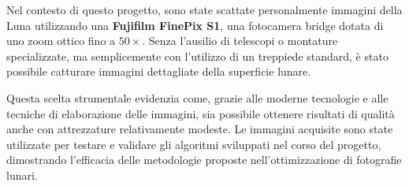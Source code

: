 Nel contesto di questo progetto, sono state scattate personalmente immagini della Luna utilizzando una \textbf{Fujifilm FinePix S1}, una fotocamera bridge dotata di uno zoom ottico fino a $50 \times$. Senza l'ausilio di telescopi o montature specializzate, ma semplicemente con l'utilizzo di un treppiede standard, è stato possibile catturare immagini dettagliate della superficie lunare.

Questa scelta strumentale evidenzia come, grazie alle moderne tecnologie e alle tecniche di elaborazione delle immagini, sia possibile ottenere risultati di qualità anche con attrezzature relativamente modeste. Le immagini acquisite sono state utilizzate per testare e validare gli algoritmi sviluppati nel corso del progetto, dimostrando l'efficacia delle metodologie proposte nell'ottimizzazione di fotografie lunari.
\cleardoublepage